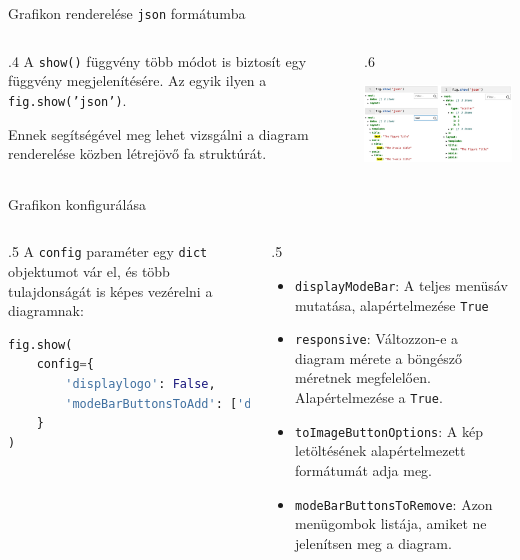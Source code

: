 \documentclass[english, aspectratio=169]{beamer}
\begin{document}
\begin{frame}{Grafikon renderelése \texttt{json} formátumba}
	\begin{columns}
		\begin{column}{.4\textwidth}
			A \texttt{show()} függvény több módot is biztosít egy függvény megjelenítésére. Az egyik ilyen a \texttt{fig.show('json')}.\par\smallskip
			Ennek segítségével meg lehet vizsgálni a diagram renderelése közben létrejövő fa struktúrát. 
		\end{column}
		\begin{column}{.6\textwidth}
			\begin{center}
				\includegraphics[width=8cm, keepaspectratio]{images/plots_4.png}
			\end{center}
		\end{column}
	\end{columns}
\end{frame}

\begin{frame}[fragile]{Grafikon konfigurálása}
	\begin{columns}
		\begin{column}{.5\textwidth}
			A \texttt{config} paraméter egy \texttt{dict} objektumot vár el, és több tulajdonságát is képes vezérelni a diagramnak:
			\vspace{0.3cm}
			\begin{lstlisting}[language=python]
fig.show(
	config={
		'displaylogo': False,
		'modeBarButtonsToAdd': ['drawrect', 'drawcircle', 'eraseshape']
	}
)
			\end{lstlisting}
		\end{column}
		\begin{column}{.5\textwidth}
			\begin{itemize}
				\item \texttt{displayModeBar}: A teljes menüsáv mutatása, alapértelmezése \texttt{True}
				\item \texttt{responsive}: Változzon-e a diagram mérete a böngésző méretnek megfelelően. Alapértelmezése a \texttt{True}.
				\item \texttt{toImageButtonOptions}: A kép letöltésének alapértelmezett formátumát adja meg. 
				\item \texttt{modeBarButtonsToRemove}: Azon menügombok listája, amiket ne jelenítsen meg a diagram. 
			\end{itemize}
		\end{column}
	\end{columns}
\end{frame}
\end{document}
